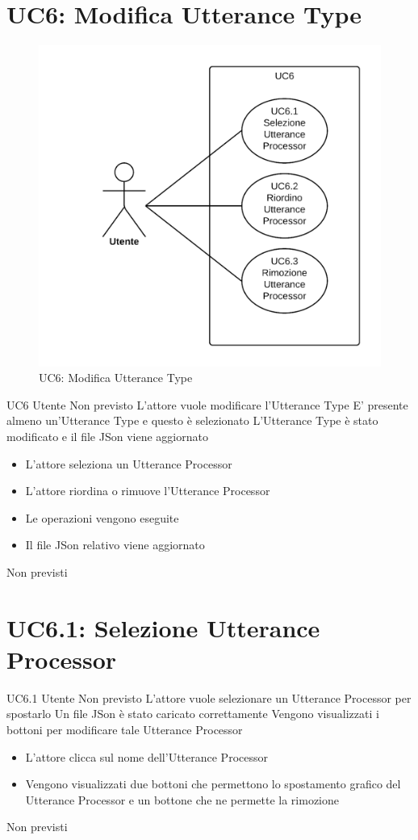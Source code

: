 \documentclass[../AnalisideiRequisiti.tex]{subfiles}
\begin{document}
\section{UC6: Modifica Utterance Type}
\begin{figure}[H]
	\centering
	\includegraphics[width=\textwidth]{../img/UC6.png}
	\caption{UC6: Modifica Utterance Type}
\end{figure}
\UserCase
{UC6}
{Utente}
{Non previsto}
{L'attore vuole modificare l'Utterance Type}
{E' presente almeno un'Utterance Type e questo è selezionato }
{L'Utterance Type è stato modificato e il file JSon viene aggiornato}
{
	\begin{itemize}
		\item{} L'attore seleziona un Utterance Processor
		\item{} L'attore riordina o rimuove l'Utterance Processor	
		\item{} Le operazioni vengono eseguite	
		\item{} Il file JSon relativo viene aggiornato		
	\end{itemize}
}
{Non previsti}

\section{UC6.1: Selezione Utterance Processor}
\UserCase
{UC6.1}
{Utente}
{Non previsto}
{L'attore vuole selezionare un Utterance Processor per spostarlo}
{Un file JSon è stato caricato correttamente }
{Vengono visualizzati i bottoni per modificare tale Utterance Processor}
{
	\begin{itemize}
		\item{} L'attore clicca sul nome dell'Utterance Processor
		\item{} Vengono visualizzati due bottoni che permettono lo spostamento grafico del Utterance Processor  e un bottone che ne permette la rimozione  		
	\end{itemize}
}
{Non previsti}
\end{document}
